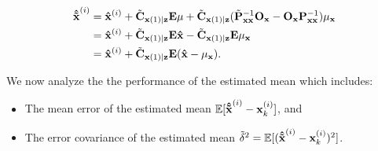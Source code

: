 \begin{equation}
\begin{split}
{\bf{\hat{\tilde x}}}^{(i)}&={\bf{\hat{ x}}}^{(i)}+\tilde{\bf C}_{{\bf x}(1)|{\bf z}}{\bf E}\mu+\tilde{\bf C}_{{\bf x}(1)|{\bf z}}(\tilde{\bf P}_{\bf xx}^{-1}{\bf O}_{\bf x}-{\bf O}_{\bf x}{\bf P}_{\bf xx}^{-1})\mu_{\bf x} \\
&={\bf{\hat{ x}}}^{(i)}+\tilde{\bf C}_{{\bf x}(1)|{\bf z}}{\bf E}{\bf{\hat{x}}}-\tilde{\bf C}_{{\bf x}(1)|{\bf z}}{\bf E}\mu_{\bf x} \\
&={\bf{\hat{ x}}}^{(i)}+\tilde{\bf C}_{{\bf x}(1)|{\bf z}}{\bf E}({\bf{\hat{x}}}-\mu_{\bf x}). \\
\end{split}
\end{equation}

We now analyze the the performance of the estimated mean which includes:
\begin{itemize}
  \item The mean error of the estimated mean $\mathbb{E}[{\bf{\hat{\tilde x}}}^{(i)}-{\bf x}^{(i)}_{k}]$, and
  \item The error covariance of the estimated mean $\tilde\delta^2=\mathbb{E}[({\bf{\hat{\tilde x}}}^{(i)}-{\bf x}^{(i)}_{k})^2]$.
\end{itemize}

